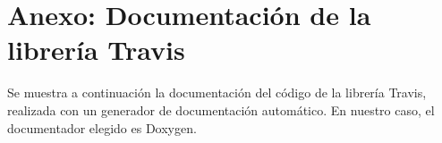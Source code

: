 \appendix

\chapter{Anexo: Documentación de la librería Travis}

{\Large Se muestra a continuación la documentación del código de la librería Travis, realizada con un generador de documentación automático. En nuestro caso, el documentador elegido es Doxygen.}
